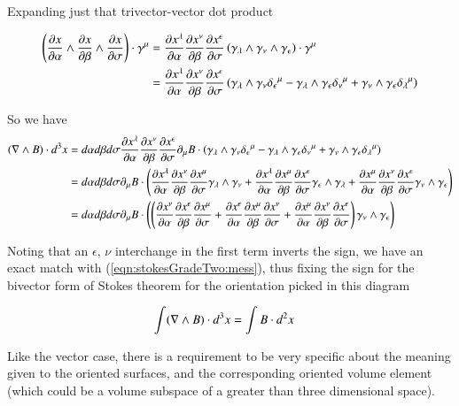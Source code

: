 Expanding just that trivector-vector dot product

\begin{align*}
\left( \frac{\partial {x}}{\partial {\alpha}} \wedge \frac{\partial {x}}{\partial {\beta}} \wedge \frac{\partial {x}}{\partial {\sigma}} \right) \cdot \gamma^\mu 
&=
\frac{\partial {x^\lambda}}{\partial {\alpha}} \frac{\partial {x^\nu}}{\partial {\beta}} \frac{\partial {x^\epsilon}}{\partial {\sigma}} \left( \gamma_\lambda \wedge \gamma_\nu \wedge \gamma_\epsilon \right) \cdot \gamma^\mu  \\
&=
\frac{\partial {x^\lambda}}{\partial {\alpha}} \frac{\partial {x^\nu}}{\partial {\beta}} \frac{\partial {x^\epsilon}}{\partial {\sigma}} \left( 
\gamma_\lambda \wedge \gamma_\nu {\delta_\epsilon}^\mu
-\gamma_\lambda \wedge \gamma_\epsilon {\delta_\nu}^\mu
+\gamma_\nu \wedge \gamma_\epsilon {\delta_\lambda}^\mu
\right) 
\end{align*}

So we have
\begin{align*}
(\nabla \wedge B) \cdot d^3 x
&=
d\alpha d\beta d\sigma \frac{\partial {x^\lambda}}{\partial {\alpha}} \frac{\partial {x^\nu}}{\partial {\beta}} \frac{\partial {x^\epsilon}}{\partial {\sigma}} \partial_\mu B \cdot \left( 
\gamma_\lambda \wedge \gamma_\nu {\delta_\epsilon}^\mu
-\gamma_\lambda \wedge \gamma_\epsilon {\delta_\nu}^\mu
+\gamma_\nu \wedge \gamma_\epsilon {\delta_\lambda}^\mu
\right) 
\\
&=
d\alpha d\beta d\sigma 
\partial_\mu B \cdot \left( 
  \frac{\partial {x^\lambda}}{\partial {\alpha}} \frac{\partial {x^\nu}}{\partial {\beta}} \frac{\partial {x^\mu}}{\partial {\sigma}} \gamma_\lambda \wedge \gamma_\nu 
+ \frac{\partial {x^\lambda}}{\partial {\alpha}} \frac{\partial {x^\mu}}{\partial {\beta}} \frac{\partial {x^\epsilon}}{\partial {\sigma}} \gamma_\epsilon \wedge \gamma_\lambda 
+ \frac{\partial {x^\mu}}{\partial {\alpha}} \frac{\partial {x^\nu}}{\partial {\beta}} \frac{\partial {x^\epsilon}}{\partial {\sigma}} \gamma_\nu \wedge \gamma_\epsilon 
\right) 
\\
&=
d\alpha d\beta d\sigma 
\partial_\mu B \cdot 
\left( 
\left( 
  \frac{\partial {x^\nu}}{\partial {\alpha}} \frac{\partial {x^\epsilon}}{\partial {\beta}} \frac{\partial {x^\mu}}{\partial {\sigma}} 
+ \frac{\partial {x^\epsilon}}{\partial {\alpha}} \frac{\partial {x^\mu}}{\partial {\beta}} \frac{\partial {x^\nu}}{\partial {\sigma}} 
+ \frac{\partial {x^\mu}}{\partial {\alpha}} \frac{\partial {x^\nu}}{\partial {\beta}} \frac{\partial {x^\epsilon}}{\partial {\sigma}} 
\right) 
\gamma_\nu \wedge \gamma_\epsilon 
\right) 
\\
\end{align*}

Noting that an $\epsilon$, $\nu$ interchange in the first term inverts the sign, we have an exact match with (\ref{eqn:stokesGradeTwo:mess}), thus fixing the sign for the
bivector form of Stokes theorem for the orientation picked in this diagram

\begin{align}
\int (\nabla \wedge B) \cdot d^3 x &= \int B \cdot d^2 x
\end{align}

Like the vector case, there is a requirement to be very specific about the meaning given to the oriented surfaces, and the corresponding oriented volume element (which could be a volume subspace of a greater than three dimensional space).

\EndNoBibArticle
